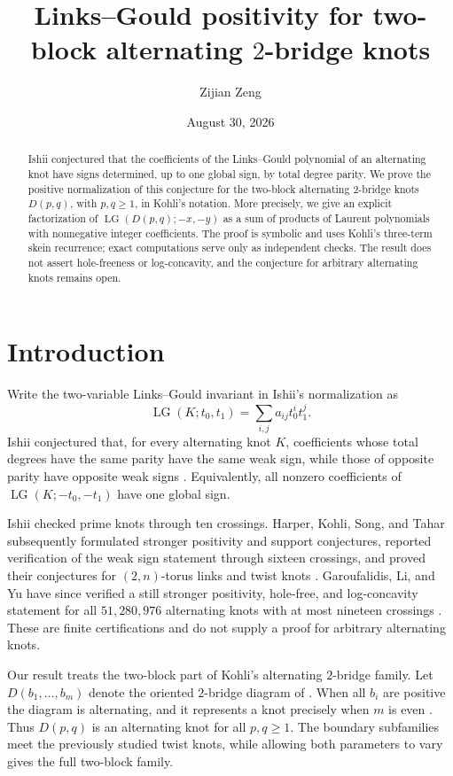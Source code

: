 \documentclass[11pt]{amsart}
\title{Links--Gould positivity for two-block alternating
$2$-bridge knots}
\author{Zijian Zeng}
\date{August 30, 2026}
\theoremstyle{remark}
\newcommand{\LG}{\operatorname{LG}}
\begin{document}
\begin{abstract}
Ishii conjectured that the coefficients of the Links--Gould polynomial of
an alternating knot have signs determined, up to one global sign, by total
degree parity.  We prove the positive normalization of this conjecture for
the two-block alternating $2$-bridge knots $D(p,q)$, with $p,q\geq1$, in
Kohli's notation.  More precisely, we give an explicit factorization of
$\LG(D(p,q);-x,-y)$ as a sum of products of Laurent polynomials with
nonnegative integer coefficients.  The proof is symbolic and uses Kohli's
three-term skein recurrence; exact computations serve only as independent
checks.  The result does not assert hole-freeness or log-concavity, and the
conjecture for arbitrary alternating knots remains open.
\end{abstract}

\maketitle

\section{Introduction}

Write the two-variable Links--Gould invariant in Ishii's normalization as
\[
  \LG(K;t_0,t_1)=\sum_{i,j}a_{ij}t_0^it_1^j.
\]
Ishii conjectured that, for every alternating knot $K$, coefficients whose
total degrees have the same parity have the same weak sign, while those of
opposite parity have opposite weak signs \cite{Ishii2006}.  Equivalently,
all nonzero coefficients of $\LG(K;-t_0,-t_1)$ have one global sign.

Ishii checked prime knots through ten crossings.  Harper, Kohli, Song, and
Tahar subsequently formulated stronger positivity and support conjectures,
reported verification of the weak sign statement through sixteen crossings,
and proved their conjectures for $(2,n)$-torus links and twist knots
\cite{HKST2025}.  Garoufalidis, Li, and Yu have since verified a still
stronger positivity, hole-free, and log-concavity statement for all
$51{,}280{,}976$ alternating knots with at most nineteen crossings
\cite{GLY2026}.  These are finite certifications and do not supply a proof
for arbitrary alternating knots.

Our result treats the two-block part of Kohli's alternating $2$-bridge
family.  Let $D(b_1,\ldots,b_m)$ denote the oriented $2$-bridge diagram of
\cite[Figures~3 and~4]{Kohli2018}.  When all $b_i$ are positive the diagram
is alternating, and it represents a knot precisely when $m$ is even
\cite[Remark~2.13]{Kohli2018}.  Thus $D(p,q)$ is an alternating knot for
all $p,q\geq1$.  The boundary subfamilies meet the previously studied twist
knots, while allowing both parameters to vary gives the full two-block
family.
\end{document}
